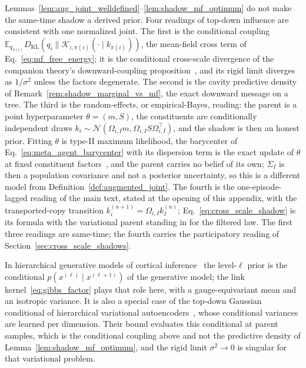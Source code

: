 \documentclass[11pt]{article}
\begin{document}
Lemmas~\ref{lem:aug_joint_welldefined}--\ref{lem:shadow_mf_optimum} do not make the same-time shadow a derived prior. Four readings of top-down influence are consistent with one normalized joint. The first is the conditional coupling $\mathbb{E}_{q_{\pi(i)}} D_{\mathrm{KL}}(q_i\|\mathcal{K}_{i,\pi(i)}(\cdot \mid k_{\pi(i)}))$, the mean-field cross term of Eq.~\eqref{eq:mf_free_energy}; it is the conditional cross-scale divergence of the companion theory's downward-coupling proposition~\cite[Ch.~12]{DennisGaugeVFE2026}, and its rigid limit diverges as $1/\sigma^2$ unless the factors degenerate. The second is the cavity predictive density of Remark~\ref{rem:shadow_marginal_vs_mf}, the exact downward message on a tree. The third is the random-effects, or empirical-Bayes, reading: the parent is a point hyperparameter $\theta = (m, S)$, the constituents are conditionally independent draws $k_i \sim \mathcal{N}(\Omega_{i,I} m, \Omega_{i,I} S \Omega_{i,I}^\top)$, and the shadow is then an honest prior. Fitting $\theta$ is type-II maximum likelihood, the barycenter of Eq.~\eqref{eq:meta_agent_barycenter} with its dispersion term is the exact update of $\theta$ at fixed constituent factors~\cite{Neal1998}, and the parent carries no belief of its own; $\Sigma_I$ is then a population covariance and not a posterior uncertainty, so this is a different model from Definition~\ref{def:augmented_joint}. The fourth is the one-episode-lagged reading of the main text, stated at the opening of this appendix, with the transported-copy transition $k_i^{(n+1)} = \Omega_{i,I} k_I^{(n)}$; Eq.~\eqref{eq:cross_scale_shadow} is its formula with the variational parent standing in for the filtered law. The first three readings are same-time; the fourth carries the participatory reading of Section~\ref{sec:cross_scale_shadows}.

In hierarchical generative models of cortical inference~\cite{friston2008hierarchical, parr2022active} the level-$\ell$ prior is the conditional $p(x^{(\ell)} \mid x^{(\ell+1)})$ of the generative model; the link kernel~\eqref{eq:gibbs_factor} plays that role here, with a gauge-equivariant mean and an isotropic variance. It is also a special case of the top-down Gaussian conditional of hierarchical variational autoencoders~\cite{Sonderby2016}, whose conditional variances are learned per dimension. Their bound evaluates this conditional at parent samples, which is the conditional coupling above and not the predictive density of Lemma~\ref{lem:shadow_mf_optimum}, and the rigid limit $\sigma^2 \to 0$ is singular for that variational problem.
\end{document}

